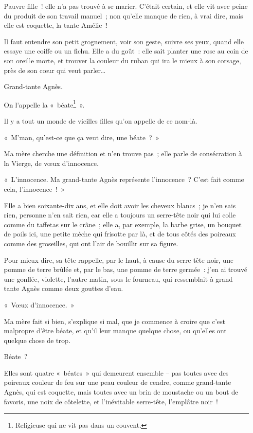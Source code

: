\documentclass[french,twoside]{book} %
\begin{document}
Pauvre fille ! elle n’a pas trouvé à se marier. C’était certain, et elle vit avec peine du produit de son travail manuel ; non qu’elle manque de rien, à vrai dire, mais elle est coquette, la tante Amélie !\par
Il faut entendre son petit grognement, voir son geste, suivre ses yeux, quand elle essaye une coiffe ou un fichu. Elle a du goût : elle sait planter une rose au coin de son oreille morte, et trouver la couleur du ruban qui ira le mieux à son corsage, près de son cœur qui veut parler…\par
Grand-tante Agnès.\par
On l’appelle la « béate\footnote{Religieuse qui ne vit pas dans un couvent.} ».\par
Il y a tout un monde de vieilles filles qu’on appelle de ce nom-là.\par
« M’man, qu’est-ce que ça veut dire, une béate ? »\par
Ma mère cherche une définition et n’en trouve pas ; elle parle de consécration à la Vierge, de vœux d’innocence.\par
« L’innocence. Ma grand-tante Agnès représente l’innocence ? C’est fait comme cela, l’innocence ! »\par
Elle a bien soixante-dix ans, et elle doit avoir les cheveux blancs ; je n’en sais rien, personne n’en sait rien, car elle a toujours un serre-tête noir qui lui colle comme du taffetas sur le crâne ; elle a, par exemple, la barbe grise, un bouquet de poils ici, une petite mèche qui frisotte par là, et de tous côtés des poireaux comme des groseilles, qui ont l’air de bouillir sur sa figure.\par
Pour mieux dire, sa tête rappelle, par le haut, à cause du serre-tête noir, une pomme de terre brûlée et, par le bas, une pomme de terre germée : j’en ai trouvé une gonflée, violette, l’autre matin, sous le fourneau, qui ressemblait à grand-tante Agnès comme deux gouttes d’eau.\par
« Vœux d’innocence. »\par
Ma mère fait si bien, s’explique si mal, que je commence à croire que c’est malpropre d’être béate, et qu’il leur manque quelque chose, ou qu’elles ont quelque chose de trop.\par
Béate ?\par
Elles sont quatre « béates » qui demeurent ensemble – pas toutes avec des poireaux couleur de feu sur une peau couleur de cendre, comme grand-tante Agnès, qui est coquette, mais toutes avec un brin de moustache ou un bout de favoris, une noix de côtelette, et l’inévitable serre-tête, l’emplâtre noir !\par
\end{document}
